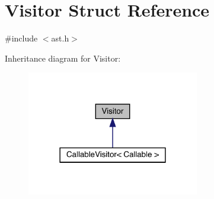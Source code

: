 \hypertarget{struct_visitor}{}\section{Visitor Struct Reference}
\label{struct_visitor}


{\ttfamily \#include $<$ast.\+h$>$}



Inheritance diagram for Visitor\+:
\nopagebreak
\begin{figure}[H]
\begin{center}
\leavevmode
\includegraphics[width=213pt]{struct_visitor__inherit__graph}
\end{center}
\end{figure}
